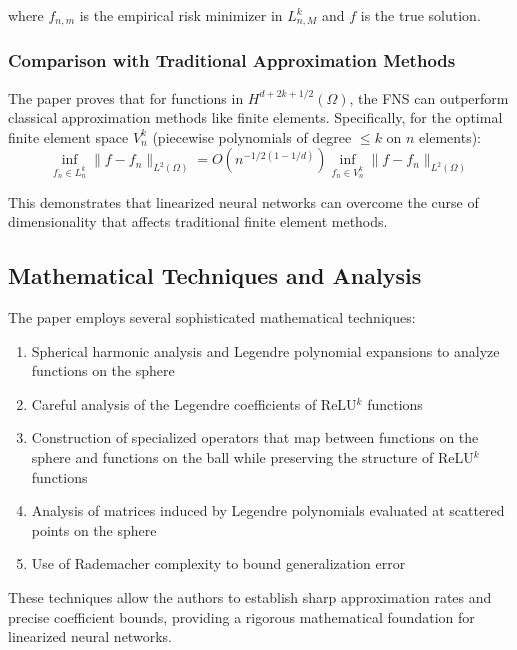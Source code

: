 \documentclass[11pt]{article}
\begin{document}
where $f_{n,m}$ is the empirical risk minimizer in $L_{n,M}^k$ and $f$ is the true solution.

\subsubsection{Comparison with Traditional Approximation Methods}

The paper proves that for functions in $H^{d+2k+1/2}(\Omega)$, the FNS can outperform classical approximation methods like finite elements. Specifically, for the optimal finite element space $V_n^k$ (piecewise polynomials of degree $\leq k$ on $n$ elements):
\begin{equation}
\inf_{f_n \in L_n^k} \|f - f_n\|_{L^2(\Omega)} = O\left(n^{-1/2(1-1/d)}\right) \inf_{f_n \in V_n^k} \|f - f_n\|_{L^2(\Omega)}
\end{equation}

This demonstrates that linearized neural networks can overcome the curse of dimensionality that affects traditional finite element methods.

\subsection{Mathematical Techniques and Analysis}

The paper employs several sophisticated mathematical techniques:

\begin{enumerate}
    \item Spherical harmonic analysis and Legendre polynomial expansions to analyze functions on the sphere
    
    \item Careful analysis of the Legendre coefficients of ReLU$^k$ functions
    
    \item Construction of specialized operators that map between functions on the sphere and functions on the ball while preserving the structure of ReLU$^k$ functions
    
    \item Analysis of matrices induced by Legendre polynomials evaluated at scattered points on the sphere
    
    \item Use of Rademacher complexity to bound generalization error
\end{enumerate}

These techniques allow the authors to establish sharp approximation rates and precise coefficient bounds, providing a rigorous mathematical foundation for linearized neural networks.
\end{document}
